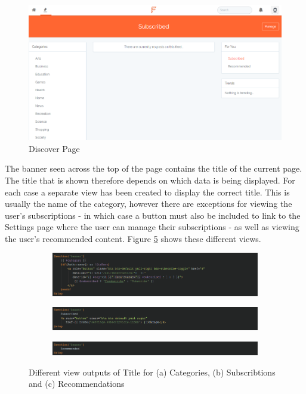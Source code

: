 \begin{figure}[H]
\centering
\includegraphics[width=\textwidth]{Images/Implementation/DiscoverPage}
\caption{Discover Page}
\label{fig:DiscoverPage}
\end{figure}

The banner seen across the top of the page contains the title of the current page. The title that is shown therefore depends on which data is being displayed. For each case a separate view has been created to display the correct title. This is usually the name of the category, however there are exceptions for viewing the user's subscriptions - in which case a button must also be included to link to the Settings page where the user can manage their subscriptions - as well as viewing the user's recommended content. Figure \ref{fig:DiscoverTitle} shows these different views.

\begin{figure}[H]
\centering
\begin{subfigure}[b]{1\linewidth}
	\includegraphics[width=\textwidth]{Images/Implementation/CategoryBladePhp}
	\caption{}
	\label{fig:CategoryBladePhp}
\end{subfigure}
\begin{subfigure}[b]{1\linewidth}
	\includegraphics[width=\textwidth]{Images/Implementation/IndexBladePhp}
	\caption{}
	\label{fig:IndexBladePhp}
\end{subfigure}
\begin{subfigure}[b]{1\linewidth}
	\includegraphics[width=\textwidth]{Images/Implementation/RecommendedBladePhp}
	\caption{}
	\label{fig:RecommendedBladePhp}
\end{subfigure}
\caption{Different view outputs of Title for (a) Categories, (b) Subscribtions and (c) Recommendations}
\label{fig:DiscoverTitle}
\end{figure}


